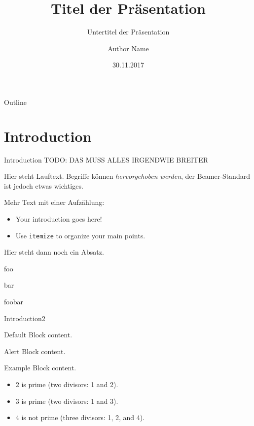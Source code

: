 \documentclass[10pt]{beamer}
\title[HAW Hamburg Beamer]{Titel der Präsentation}
\subtitle{Untertitel der Präsentation}
\author{Author Name}
\institute{Hochschule für Angewandte Wissenschaften Hamburg}
\date{30.11.2017}
\begin{document}
\begin{frame}
  \titlepage
\end{frame}

\begin{frame}{Outline}
  \tableofcontents
\end{frame}

\section{Introduction}
\begin{frame}{Introduction}
  TODO: DAS MUSS ALLES IRGENDWIE BREITER

  Hier steht Lauftext. Begriffe können \emph{hervorgehoben werden}, der Beamer-Standard ist jedoch \alert{etwas wichtiges}.

  Mehr Text mit einer Aufzählung:
  \begin{itemize}
    \item Your introduction goes here!
    \item Use \texttt{itemize} to organize your main points.
  \end{itemize}

  Hier steht dann noch ein Absatz.

  foo

  bar

  foobar
\end{frame}

\begin{frame}{Introduction2}
  \begin{block}{Default}
    Block content.
  \end{block}
  \begin{alertblock}{Alert}
    Block content.
  \end{alertblock}
  \begin{exampleblock}{Example}
    Block content.
  \end{exampleblock}
  \begin{example}
    \begin{itemize}
      \item 2 is prime (two divisors: 1 and 2).
      \item 3 is prime (two divisors: 1 and 3).
      \item 4 is not prime (\alert{three} divisors: 1, 2, and 4).
    \end{itemize}
  \end{example}
\end{frame}
\end{document}
